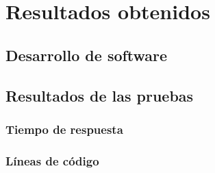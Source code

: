 \section{Resultados obtenidos}

\subsection{Desarrollo de software}

\subsection{Resultados de las pruebas}
	
	\subsubsection{Tiempo de respuesta}
	\subsubsection{Líneas de código}